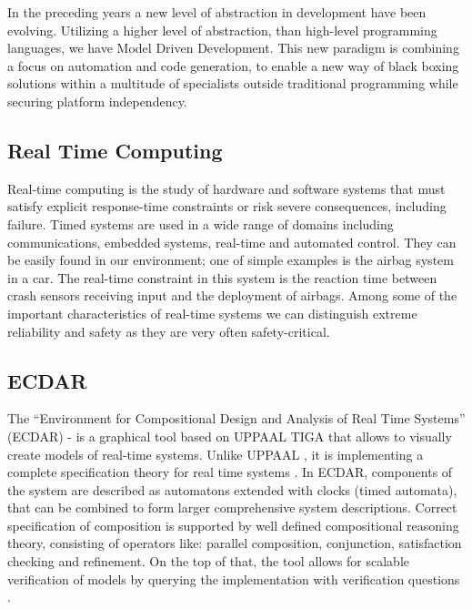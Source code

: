 In the preceding years a new level of abstraction in development have been
evolving. Utilizing a higher level of abstraction, than high-level programming
languages, we have Model Driven Development. This new paradigm is combining a
focus on automation and code generation, to enable a new way of black boxing
solutions within a multitude of specialists outside traditional programming
while securing platform independency.

\subsection {Real Time Computing \label{introduction-rts}}
%
Real-time computing is the study of hardware and software systems that must
satisfy explicit response-time constraints or risk severe consequences,
including failure. Timed systems are used in a wide range of domains including
communications, embedded systems, real-time and automated control.  They can be
easily found in our environment; one of simple examples is the airbag system in
a car.  The real-time constraint in this system is the reaction time between
crash sensors receiving input and the deployment of airbags. Among some of the
important characteristics of real-time systems we can distinguish extreme
reliability and safety as they are very often safety-critical.

\subsection{ECDAR \label{introduction-ecdar}}
%
The “Environment for Compositional Design and Analysis of Real Time Systems”
(ECDAR) - is a graphical tool based on UPPAAL TIGA
\cite{behrmann_uppaal-tiga:_2006} that allows to visually create models of
real-time systems. Unlike UPPAAL \cite{larsen_uppaal_1997}, it is implementing a
complete specification theory for real time systems
\cite{David:2010:TIA:1755952.1755967,conf/atva/DavidLLNW10}. In ECDAR,
components of the system are described as automatons extended with clocks (timed
automata), that can be combined to form larger comprehensive system
descriptions. Correct specification of composition is supported by well defined
compositional reasoning theory, consisting of operators like: parallel
composition, conjunction, satisfaction checking and refinement. On the top of
that, the tool allows for scalable verification of models by querying the
implementation with verification questions \cite{conf/atva/DavidLLNW10}.
%

